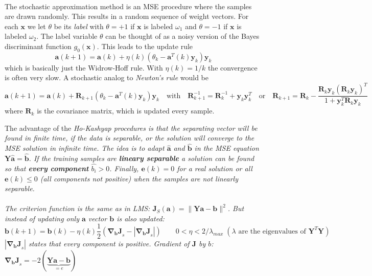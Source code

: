  	\\
    The stochastic approximation method is an MSE procedure where the samples are drawn randomly.
    This results in a random sequence of weight vectors.
 	For each $\bm x$ we let $\theta$ be its \emph{label} with $\theta=+1$ if $\bm x$ is labeled $\omega_1$ and $\theta=-1$ if $\bm x$ is labeled $\omega_2$.
 	The label variable $\theta$ can be thought of as a noisy version of the Bayes discriminant function $g_0(\bm x)$.
    This leads to the update rule
    \begin{equation*}
        \bm a(k+1)=\bm a(k)+\eta(k)(\theta_k - \bm a^T(k)\bm y_k)\bm y_k
    \end{equation*}
  	which is basically just the Widrow-Hoff rule.
  	With $\eta(k)=1/k$ the convergence is often very slow.
  	A stochastic analog to \emph{Newton's rule} would be
  	\begin{equation*}
     	\bm a(k+1)=\bm a(k)+\bm R_{k+1}(\theta_k - \bm a^T(k)\bm y_k)\bm y_k
     	\quad \text{with} \quad 
     	\bm R_{k+1}^{-1}= \bm R_{k}^{-1} + \bm y_k \bm y_k^T
     	\quad \text{or} \quad
     	\bm R_{k+1}= \bm R_{k} - \frac{\bm R_{k} \bm y_k(\bm R_{k} \bm y_k)^T}{1+\bm y_k^T \bm R_{k} \bm y_k}
 	\end{equation*}
 	where $\bm R_{k}$ is the covariance matrix, which is updated every sample.
 	
 	
 	The advantage of the \em Ho-Kashyap procedures \em is that the separating vector will be found in finite time, if the data is separable, or the 
 	solution will converge to the MSE solution in infinite time.
 	The idea is to adapt $\hat{\bm a}$ and $\hat{\bm b}$ in the MSE equation $\bm Y \hat{\bm a} = \hat{\bm b}$.
 	If the training samples are \textbf{lineary separable} a solution can be found so that 
 	\textbf{every component} $\hat{b_i}> 0$. Finally, $\bm e(k) = 0$ for a real solution or 
 	all $\bm e(k) \leq 0$ (all components not positive) when the samples are not linearly separable.\\
 	
 	\\
 	The criterion function is the same as in LMS: $\bm J_S(\bm a)=\|\bm Y \bm a - \bm b \|^2$. 
 	But instead of updating only $\bm a$ vector $\bm b$ is also updated:
 	$$ \bm b(k+1)=\bm b(k)- \eta(k) \frac{1}{2} \left(\bm{\nabla_b J}_s - |\bm{\nabla_b J}_s|\right) \qquad 
 	0 <\eta < 2/\lambda_{max} \; (\lambda \text{ are the eigenvalues of } \bm Y^T \bm Y)$$
 	$|\bm{\nabla_b J}_s|$ states that every component is positive. 
 	Gradient of $\bm J$ by $b$: $\bm{\nabla_b J}_s = -2(\underbrace{\bm{Y a - b}}_{=e})$
 	
